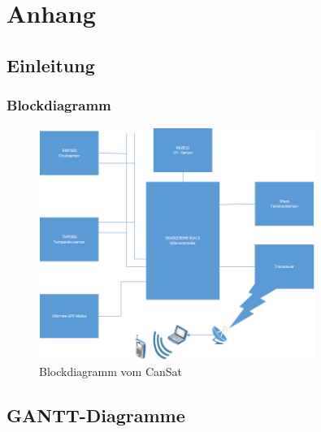 \section{Anhang}

\subsection{Einleitung}
\subsubsection{Blockdiagramm}
\begin{figure}[htbp]
	\centering
	\includegraphics[width=0.8\textwidth]{8_Anhang/Blockdiagramm.png}
	\caption{Blockdiagramm vom CanSat}
	\label{blockdiagramm}
\end{figure}

\newpage

\subsection{GANTT-Diagramme}
